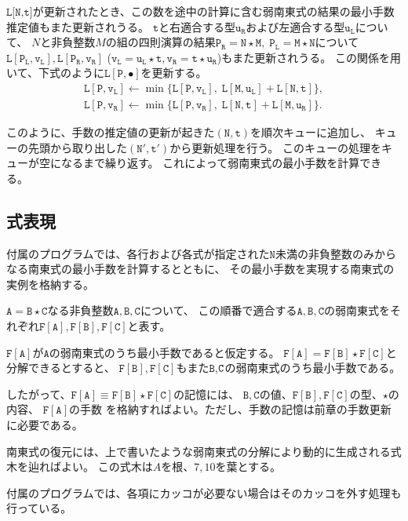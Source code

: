 \documentclass[10pt,dvipdfmx]{ujarticle}
\begin{document}
$\texttt{L[N,t]}$が更新されたとき、この数を途中の計算に含む弱南東式の結果の最小手数推定値もまた更新されうる。
$\mathtt{t}$と右適合する型$\mathtt{u_R}$および左適合する型$\mathtt{u_L}$について、
$N$と非負整数$M$の組の四則演算の結果$\mathtt{P_R}=\mathtt{N}\star \mathtt{M},\;\mathtt{P_L}=\mathtt{M}\star \mathtt{N}$について
$\mathtt{L[P_L,v_L]}, \mathtt{L[P_R,v_R]}$
($\mathtt{v_L}=\mathtt{u_L}\star \mathtt{t}, \mathtt{v_R}=\mathtt{t}\star \mathtt{u_R}$)もまた更新されうる。
この関係を用いて、下式のように$\mathtt{L[P,\bullet]}$を更新する。
\begin{equation}
    \begin{aligned}
        \mathtt{L[P,v_L]}\leftarrow\min\{\mathtt{L[P,v_L]},\;\mathtt{L[M,u_L]}+\mathtt{L[N,t]}\}, \\
        \mathtt{L[P,v_R]}\leftarrow\min\{\mathtt{L[P,v_R]},\;\mathtt{L[N,t]}+\mathtt{L[M,u_R]}\}.
    \end{aligned}
\end{equation}

このように、手数の推定値の更新が起きた$\mathtt{(N,t)}$を順次キューに追加し、
キューの先頭から取り出した$\mathtt{(N',t')}$から更新処理を行う。
このキューの処理をキューが空になるまで繰り返す。
これによって弱南東式の最小手数を計算できる。

\subsection{式表現}
付属のプログラムでは、各行および各式が指定された$\mathtt{N}$未満の非負整数のみからなる南東式の最小手数を計算するとともに、
その最小手数を実現する南東式の実例を格納する。

\newcommand{\FA}[1]{\mathtt{F[#1]}}
$\mathtt{A}=\mathtt{B}\star \mathtt{C}$なる非負整数$\mathtt{A,B,C}$について、
この順番で適合する$\mathtt{A,B,C}$の弱南東式をそれぞれ$\FA{A}, \FA{B}, \FA{C}$と表す。

$\FA{A}$が$\mathtt{A}$の弱南東式のうち最小手数であると仮定する。
$\FA{A}=\FA{B}\star\FA{C}$と分解できるとすると、
$\FA{B},\FA{C}$もまた$\mathtt{B}$,$\tt C$の弱南東式のうち最小手数である。

したがって、$\FA{A}\equiv \FA B\star\FA C$の記憶には、
$\mathtt{B},\mathtt{C}$の値、$\FA B, \FA C$の型、$\star$の内容、
$\FA{A}$の手数
を格納すればよい。ただし、手数の記憶は前章の手数更新に必要である。

南東式の復元には、上で書いたような弱南東式の分解により動的に生成される式木を辿ればよい。
この式木は$A$を根、$7,10$を葉とする。

付属のプログラムでは、各項にカッコが必要ない場合はそのカッコを外す処理も行っている。
\end{document}
